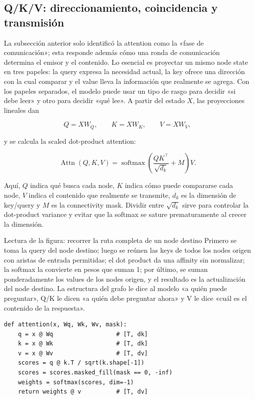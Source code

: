 \subsection{Q/K/V: direccionamiento, coincidencia y transmisión}

La subsección anterior solo identificó la attention como la «fase de comunicación»; esta responde además cómo una ronda de comunicación determina el emisor y el contenido. Lo esencial es proyectar un mismo node state en tres papeles: la query expresa la necesidad actual, la key ofrece una dirección con la cual comparar y el value lleva la información que realmente se agrega. Con los papeles separados, el modelo puede usar un tipo de rasgo para decidir «si debe leer» y otro para decidir «qué lee». A partir del estado $X$, las proyecciones lineales dan

\[
Q=XW_Q,\qquad K=XW_K,\qquad V=XW_V,
\]

y se calcula la scaled dot-product attention:

\[
\operatorname{Attn}(Q,K,V)=
\operatorname{softmax}\!\left(\frac{QK^\top}{\sqrt{d_k}}+M\right)V.
\]

Aquí, $Q$ indica qué busca cada node, $K$ indica cómo puede compararse cada node, $V$ indica el contenido que realmente se transmite, $d_k$ es la dimensión de key/query y $M$ es la connectivity mask. Dividir entre $\sqrt{d_k}$ sirve para controlar la dot-product variance y evitar que la softmax se sature prematuramente al crecer la dimensión.


\begin{knowledgebox}{Lectura de la figura: recorrer la ruta completa de un node destino}
Primero se toma la query del node destino; luego se reúnen las keys de todos los nodes origen con aristas de entrada permitidas; el dot product da una affinity sin normalizar; la softmax la convierte en pesos que suman 1; por último, se suman ponderadamente los values de los nodes origen, y el resultado es la actualización del node destino. La estructura del grafo le dice al modelo «a quién puede preguntar», Q/K le dicen «a quién debe preguntar ahora» y V le dice «cuál es el contenido de la respuesta».
\end{knowledgebox}

\begin{lstlisting}[caption={Expresión matricial mínima de la attention de una sola cabeza; una implementación real también requiere las dimensiones de lote/head y dropout.}]
def attention(x, Wq, Wk, Wv, mask):
    q = x @ Wq                  # [T, dk]
    k = x @ Wk                  # [T, dk]
    v = x @ Wv                  # [T, dv]
    scores = q @ k.T / sqrt(k.shape[-1])
    scores = scores.masked_fill(mask == 0, -inf)
    weights = softmax(scores, dim=-1)
    return weights @ v          # [T, dv]
\end{lstlisting}

